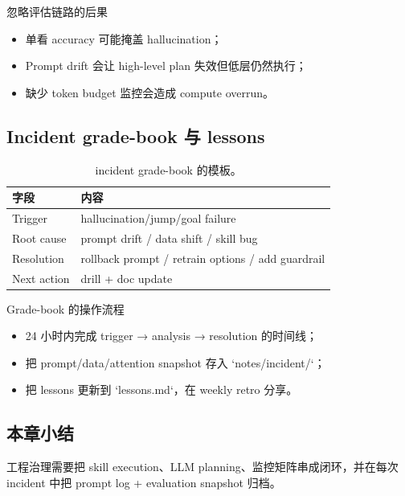 \begin{warningbox}{忽略评估链路的后果}
\begin{itemize}
    \item 单看 accuracy 可能掩盖 hallucination；
    \item Prompt drift 会让 high-level plan 失效但低层仍然执行；
    \item 缺少 token budget 监控会造成 compute overrun。
\end{itemize}
\end{warningbox}

\subsection{Incident grade-book 与 lessons}

\begin{table}[H]
\centering
\begin{tabular}{p{4cm}p{6cm}}
\toprule
字段 & 内容 \\
\midrule
Trigger & hallucination/jump/goal failure \\
Root cause & prompt drift / data shift / skill bug \\
Resolution & rollback prompt / retrain options / add guardrail \\
Next action & drill + doc update \\
\bottomrule
\end{tabular}
\caption{incident grade-book 的模板。}
\end{table}

\begin{importantbox}{Grade-book 的操作流程}
\begin{itemize}
    \item 24 小时内完成 trigger → analysis → resolution 的时间线；
    \item 把 prompt/data/attention snapshot 存入 `notes/incident/`；
    \item 把 lessons 更新到 `lessons.md`，在 weekly retro 分享。
\end{itemize}
\end{importantbox}

\subsection{本章小结}

工程治理需要把 skill execution、LLM planning、监控矩阵串成闭环，并在每次 incident 中把 prompt log + evaluation snapshot 归档。

